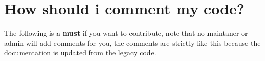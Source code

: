 \chapter{How should i comment my code?}
\hypertarget{md__2_users_2spirosmag_2_documents_2_algo_plus_2_c_o_m_m_e_n_t_s}{}\label{md__2_users_2spirosmag_2_documents_2_algo_plus_2_c_o_m_m_e_n_t_s}
\label{md__2_users_2spirosmag_2_documents_2_algo_plus_2_c_o_m_m_e_n_t_s_autotoc_md0}%
%
 The following is a {\bfseries{must}} if you want to contribute, note that no maintaner or admin will add comments for you, the comments are strictly like this because the documentation is updated from the legacy code.


\begin{DoxyCode}{0}
\DoxyCodeLine{}
\DoxyCodeLine{\}}

\end{DoxyCode}



\begin{DoxyCode}{0}
\DoxyCodeLine{}
\DoxyCodeLine{\}}

\end{DoxyCode}
 